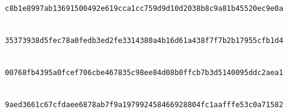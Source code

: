 \documentclass[pdflatex,sn-mathphys-num]{sn-jnl}%
\theoremstyle{thmstyleone}%
\theoremstyle{thmstyletwo}%
\theoremstyle{thmstylethree}%
\begin{document}
\begin{landscape}
\noindent{}\\
\texttt{c8b1e899\allowbreak{}7ab13691\allowbreak{}500492e6\allowbreak{}19cca1cc\allowbreak{}759d9d10\allowbreak{}d2038b8c\allowbreak{}9a81b455\allowbreak{}20ec9e0a}\par
\noindent{}\\
\texttt{35373938\allowbreak{}d5fec78a\allowbreak{}0fedb3ed\allowbreak{}2fe33143\allowbreak{}80a4b16d\allowbreak{}61a438f7\allowbreak{}f7b2b179\allowbreak{}55cfb1d4}\par
\noindent{}\\
\texttt{00768fb4\allowbreak{}395a0fce\allowbreak{}f706cbe4\allowbreak{}67835c98\allowbreak{}ee84d08b\allowbreak{}0ffcb7b3\allowbreak{}d5140095\allowbreak{}ddc2aea1}\par
\noindent{}\\
\texttt{9aed3661\allowbreak{}c67cfdae\allowbreak{}e6878ab7\allowbreak{}f9a19799\allowbreak{}24584669\allowbreak{}28804fc1\allowbreak{}aafffe53\allowbreak{}c0a71582}\par

\end{landscape}
\end{document}
